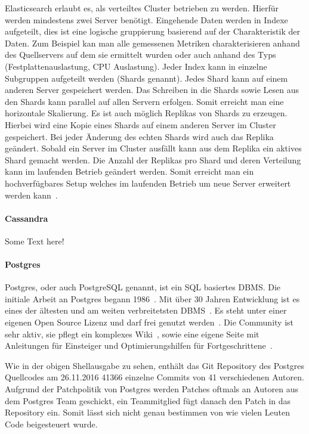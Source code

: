 Elasticsearch erlaubt es, als verteiltes Cluster betrieben zu werden. Hierfür
werden mindestens zwei Server benötigt. Eingehende Daten werden in Indexe
aufgeteilt, dies ist eine logische gruppierung basierend auf der Charakteristik
der Daten. Zum Beispiel kan man alle gemessenen Metriken charakterisieren
anhand des Quellservers auf dem sie ermittelt wurden oder auch anhand des 
Typs (Festplattenauslastung, CPU Auslastung). Jeder Index kann in einzelne
Subgruppen aufgeteilt werden (Shards genannt). Jedes Shard kann auf einem
anderen Server gespeichert werden. Das Schreiben in die Shards sowie Lesen aus
den Shards kann parallel auf allen Servern erfolgen. Somit erreicht man eine
horizontale \gls{Skalierung}. Es ist auch möglich Replikas von Shards zu
erzeugen. Hierbei wird eine Kopie eines Shards auf einem anderen Server im
Cluster gespeichert. Bei jeder Änderung des echten Shards wird auch das Replika
geändert. Sobald ein Server im Cluster ausfällt kann aus dem Replika ein
aktives Shard gemacht werden. Die Anzahl der Replikas pro Shard und deren
Verteilung kann im laufenden Betrieb geändert werden. Somit erreicht man ein
hochverfügbares Setup welches im laufenden Betrieb um neue Server erweitert
werden kann~\cite{es_concepts}.
\tm%

\paragraph{Cassandra}
\label{paragraph:cassandra}
Some Text here!
\nl%

\paragraph{Postgres}
\label{paragraph:postgres}
Postgres, oder auch PostgreSQL genannt, ist ein \gls{SQL} basiertes \gls{DBMS}.
Die initiale Arbeit an Postgres begann 1986~\cite{old_postgres}. Mit über 30
Jahren Entwicklung ist es eines der ältesten und am weiten verbreitetsten
DBMS~\cite{db_ranking}. Es steht unter einer eigenen Open Source Lizenz und
darf frei genutzt werden~\cite{postgres_license}. Die Community ist sehr aktiv,
sie pflegt ein komplexes Wiki~\cite{postgres_wiki}, sowie eine eigene Seite mit
Anleitungen für Einsteiger und Optimierungshilfen für
Fortgeschrittene~\cite{postgres_tutorial}.



Wie in der obigen Shellausgabe zu sehen, enthält das \gls{Git} \gls{Repository}
des Postgres Quellcodes am 26.11.2016 41366 einzelne Commits von 41
verschiedenen Autoren. Aufgrund der Patchpolitik von Postgres werden Patches
oftmals an Autoren aus dem Postgres Team geschickt, ein Teammitglied fügt
danach den Patch in das Repository ein. Somit lässt sich nicht genau bestimmen
von wie vielen Leuten Code beigesteuert wurde.

